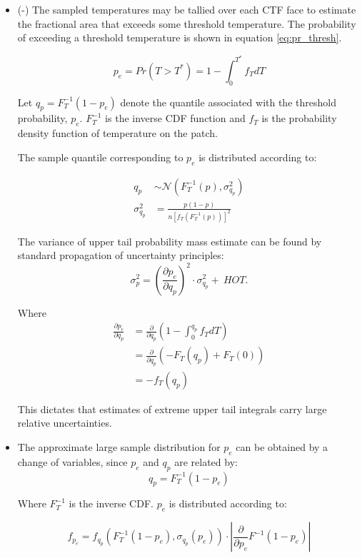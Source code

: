 \begin{itemize}
    \item (\checkmark-) The sampled temperatures may be tallied over each CTF face to estimate the fractional area that exceeds some threshold temperature.
    The probability of exceeding a threshold temperature is shown in equation \ref{eq:pr_thresh}.
    
    \begin{equation}
    p_e = Pr(T > T^*) = 1 - \int_0^{T^*} f_T dT
    \label{eq:pr_thresh}
    \end{equation}
    
    Let $q_p = F_T^{-1}(1 - p_e)$
    denote the quantile associated with the threshold probability, $p_e$.
    $F_T^{-1}$ is the inverse CDF function and $f_T$ is the probability density function of temperature on the patch.
    
    The sample quantile corresponding to $p_e$ is distributed according to:

   \begin{eqnarray}
    q_p &\sim \mathcal N \left( F_T^{-1}(p), \sigma^2_{q_p} \right) \\
    \sigma^2_{q_p} &= \frac{p(1 - p)}{n[f_T(F_T^{-1}(p))]^2}
    \end{eqnarray}
    
    The variance of upper tail probability mass estimate can be found by standard propagation of uncertainty principles:
   \begin{equation}
    \sigma_p^2 = \left(\frac{\partial p_e}{\partial q_p} \right)^2 \cdot \sigma_{q_p}^2 +\  HOT.
    \end{equation}
    
    Where
   \begin{eqnarray}
    \frac{\partial p_e}{\partial q_p} &= \frac{\partial}{\partial q_p} \left( 1 - \int_0^{q_p} f_T dT \right) \nonumber \\
    &= \frac{\partial}{\partial q_p} \left( -F_T(q_p) + F_T(0) \right) \nonumber \\
    &= -f_T(q_p)
    \end{eqnarray}
    
    This dictates that estimates of extreme upper tail integrals carry large relative uncertainties.
    \item The approximate large sample distribution for $p_e$ can be obtained by a change of variables, since $p_e$ and $q_p$ are related by:
    \begin{equation}
    q_p = F_T^{-1}(1 - p_e)
    \end{equation}
    
    Where $F_T^{-1}$ is the inverse CDF.  $p_e$ is distributed according to:
    
    \begin{equation}
    f_{p_e} = f_{q_p} \left( F_T^{-1}(1-p_e), \sigma_{q_p}(p_e) \right) \cdot \left|{ \frac{\partial}{\partial p_e} F^{-1}(1-p_e) } \right|
    \end{equation}
    
\end{itemize}


